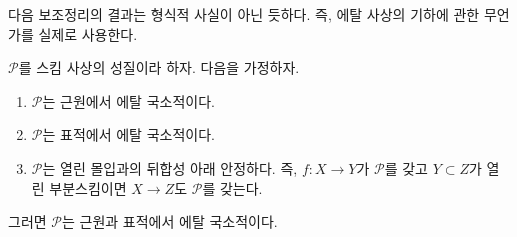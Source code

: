 \noindent
다음 보조정리의 결과는 형식적 사실이 아닌 듯하다. 즉, 에탈 사상의
기하에 관한 무언가를 실제로 사용한다.

\begin{lemma}
\label{lemma-etale-local-source-target}
$\mathcal{P}$를 스킴 사상의 성질이라 하자. 다음을 가정하자.
\begin{enumerate}
\item $\mathcal{P}$는 근원에서 에탈 국소적이다.
\item $\mathcal{P}$는 표적에서 에탈 국소적이다.
\item $\mathcal{P}$는 열린 몰입과의 뒤합성 아래 안정하다. 즉,
$f : X \to Y$가 $\mathcal{P}$를 갖고 $Y \subset Z$가 열린
부분스킴이면 $X \to Z$도 $\mathcal{P}$를 갖는다.
\end{enumerate}
그러면 $\mathcal{P}$는 근원과 표적에서 에탈 국소적이다.
\end{lemma}

